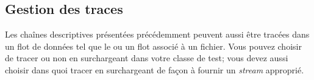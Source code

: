 \documentclass[a4paper,10pt,twoside]{book}
\begin{document}
\subsection{Gestion des traces}
Les chaînes descriptives présentées précédemment peuvent aussi être tracées dans un flot de données  tel que le  ou un flot associé à un fichier. Vous pouvez choisir de tracer ou non en surchargeant  dans votre classe de test; vous devez aussi choisir dans quoi tracer en surchargeant  de façon à fournir un \emph{stream} approprié.

\end{document}
